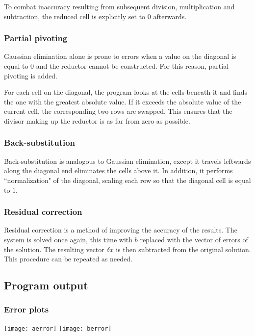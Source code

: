 \documentclass{article}
\begin{document}
	To combat inaccuracy resulting from subsequent division, multiplication and
	subtraction, the reduced cell is explicitly set to $0$ afterwards.
	
	\subsubsection{Partial pivoting}
	
	Gaussian elimination alone is prone to errors when a value on the diagonal
	is equal to $0$ and the reductor cannot be constructed. For this reason,
	partial pivoting is added.
	
	For each cell on the diagonal, the program looks at the cells beneath it and
	finds the one with the greatest absolute value. If it exceeds the absolute
	value of the current cell, the corresponding two rows are swapped. This
	ensures that the divisor making up the reductor is as far from zero as
	possible.
	
	\subsubsection{Back-substitution}
	
	Back-substitution is analogous to Gaussian elimination, except it travels
	leftwards along the diagonal end eliminates the cells above it. In addition,
	it performs ``normalization" of the diagonal, scaling each row so that the
	diagonal cell is equal to $1$.
	
	\subsubsection{Residual correction}
	
	Residual correction is a method of improving the accuracy of the results.
	The system is solved once again, this time with $b$ replaced with the vector
	of errors of the solution. The resulting vector $\delta x$ is then
	subtracted from the original solution. This procedure can be repeated as
	needed.
	
	\subsection{Program output}
	
	\subsubsection{Error plots}
	
	\texttt{[image: aerror]}
	\texttt{[image: berror]}
	
\end{document}
